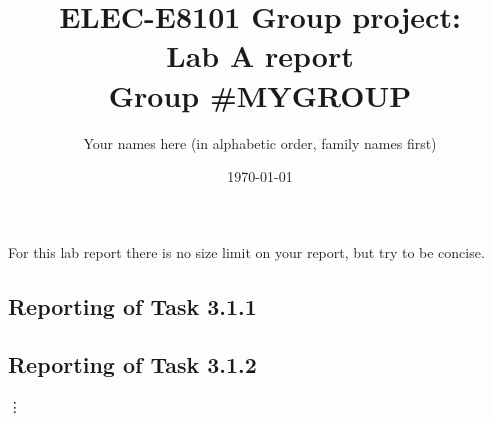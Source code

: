 \documentclass[11pt]{article}
\title{\Huge ELEC-E8101 Group project: \\ Lab A report \\ Group \#MYGROUP}
\date{\today}
\author{Your names here (in alphabetic order, family names first)}
\begin{document}
\maketitle

\begin{instructions}
For this lab report there is no size limit on your report, but try to be concise.	
\end{instructions}



\subsection*{Reporting of Task 3.1.1}


\subsection*{Reporting of Task 3.1.2}



\vdots
\end{document}

